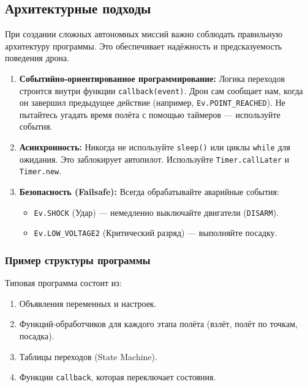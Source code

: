 \subsection{Архитектурные подходы}

При создании сложных автономных миссий важно соблюдать правильную архитектуру программы. Это обеспечивает надёжность и предсказуемость поведения дрона.

\begin{infobox}
\begin{enumerate}
    \item \textbf{Событийно-ориентированное программирование:}
    Логика переходов строится внутри функции \texttt{callback(event)}. Дрон сам сообщает нам, когда он завершил предыдущее действие (например, \texttt{Ev.POINT\_REACHED}). Не пытайтесь угадать время полёта с помощью таймеров — используйте события.
    
    \item \textbf{Асинхронность:}
    Никогда не используйте \texttt{sleep()} или циклы \texttt{while} для ожидания. Это заблокирует автопилот. Используйте \texttt{Timer.callLater} и \texttt{Timer.new}.
    
    \item \textbf{Безопасность (Failsafe):}
    Всегда обрабатывайте аварийные события:
    \begin{itemize}
        \item \texttt{Ev.SHOCK} (Удар) — немедленно выключайте двигатели (\texttt{DISARM}).
        \item \texttt{Ev.LOW\_VOLTAGE2} (Критический разряд) — выполняйте посадку.
    \end{itemize}
\end{enumerate}
\end{infobox}

\subsubsection{Пример структуры программы}
Типовая программа состоит из:
\begin{enumerate}
    \item Объявления переменных и настроек.
    \item Функций-обработчиков для каждого этапа полёта (взлёт, полёт по точкам, посадка).
    \item Таблицы переходов (State Machine).
    \item Функции \texttt{callback}, которая переключает состояния.
\end{enumerate}
